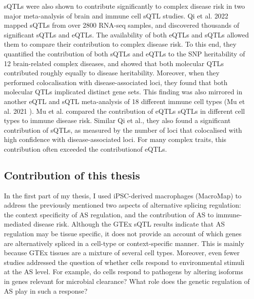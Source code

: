 sQTLs were also shown to contribute significantly to complex disease risk in two major meta-analysis of brain and immune cell sQTL studies. Qi et al. 2022 \cite{Qi2022-iz} mapped sQTLs from over 2800 RNA-seq samples, and discovered thousands of significant sQTLs and eQTLs. The availability of both eQTLs and sQTLs allowed them to compare their contribution to complex disease risk. To this end, they quantified the contribution of both sQTLs and eQTLs to the SNP heritability of 12 brain-related complex diseases, and showed that both molecular QTLs contributed roughly equally to disease heritability. Moreover, when they performed colocalisation with disease-associated loci, they found that both molecular QTLs implicated distinct gene sets. This finding was also mirrored in another eQTL and sQTL meta-analysis of 18 different immune cell types (Mu et al. 2021 \cite{Mu2021-ar}). Mu et al. compared the contribution of eQTLs sQTLs in different cell types to immune disease risk. Similar Qi et al., they also found a significant contribution of sQTLs, as measured by the number of loci that colocalised with high confidence with disease-associated loci. For many complex traits, this contribution often exceeded the contributionof eQTLs.\\

\subsection{Contribution of this thesis}
In the first part of my thesis, I used iPSC-derived macrophages (MacroMap) to address the previously mentioned two aspects of alternative splicing regulation: the context specificity of AS regulation, and the contribution of AS to immune-mediated disease risk. Although the GTEx sQTL results indicate that AS regulation may be tissue specific, it does not provide an account of which genes are alternatively spliced in a cell-type or context-specific manner. This is mainly because GTEx tissues are a mixture of several cell types. Moreover, even fewer studies addressed the question of whether cells respond to environmental stimuli at the AS level. For example, do cells respond to pathogens by altering isoforms in genes relevant for microbial clearance? What role does the genetic regulation of AS play in such a response?\\

